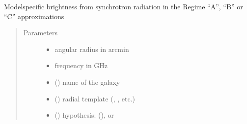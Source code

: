\documentclass[letterpaper,10pt,english]{sphinxmanual}
\begin{document}
\begin{fulllineitems}
\label{\detokenize{diffsph:diffsph.pyflux.synch_brightness_approx}}
\sphinxAtStartPar
Model\sphinxhyphen{}specific brightness from synchrotron radiation in the Regime “A”, “B” or “C” approximations
\begin{quote}\begin{description}
\item[{Parameters}] \leavevmode\begin{itemize}
\item {} 
\sphinxAtStartPar
{} \textendash{} angular radius in arcmin

\item {} 
\sphinxAtStartPar
{} \textendash{} frequency in GHz

\item {} 
\sphinxAtStartPar
{} () \textendash{} name of the galaxy

\item {} 
\sphinxAtStartPar
{} () \textendash{} radial template (, , etc.)

\item {} 
\sphinxAtStartPar
{} () \textendash{} hypothesis:  (),  or 


\end{itemize}
\end{description}
\end{quote}
\end{fulllineitems}
\end{document}
